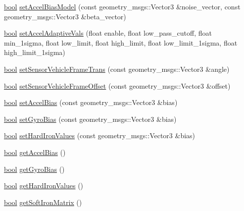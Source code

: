 \begin{DoxyCompactItemize}
\item 
\hyperlink{classbool}{bool} \hyperlink{classmicrostrain__mips__client_1_1ClMicrostainMips_a09d57c6812308c11a7e99f9d75635f51}{set\+Accel\+Bias\+Model} (const geometry\+\_\+msgs\+::\+Vector3 \&noise\+\_\+vector, const geometry\+\_\+msgs\+::\+Vector3 \&beta\+\_\+vector)
\item 
\hyperlink{classbool}{bool} \hyperlink{classmicrostrain__mips__client_1_1ClMicrostainMips_a93a968d06f2dfd58ce7ab568956df042}{set\+Accel\+Adaptive\+Vals} (float enable, float low\+\_\+pass\+\_\+cutoff, float min\+\_\+1sigma, float low\+\_\+limit, float high\+\_\+limit, float low\+\_\+limit\+\_\+1sigma, float high\+\_\+limit\+\_\+1sigma)
\item 
\hyperlink{classbool}{bool} \hyperlink{classmicrostrain__mips__client_1_1ClMicrostainMips_ac3d76fa8986d20e6b33ba4b556f09577}{set\+Sensor\+Vehicle\+Frame\+Trans} (const geometry\+\_\+msgs\+::\+Vector3 \&angle)
\item 
\hyperlink{classbool}{bool} \hyperlink{classmicrostrain__mips__client_1_1ClMicrostainMips_a8eb34d4f970c6e8a2a6ec3e80dd793bf}{set\+Sensor\+Vehicle\+Frame\+Offset} (const geometry\+\_\+msgs\+::\+Vector3 \&offset)
\item 
\hyperlink{classbool}{bool} \hyperlink{classmicrostrain__mips__client_1_1ClMicrostainMips_a8864e13bc5b385794642e49764cbfe8c}{set\+Accel\+Bias} (const geometry\+\_\+msgs\+::\+Vector3 \&bias)
\item 
\hyperlink{classbool}{bool} \hyperlink{classmicrostrain__mips__client_1_1ClMicrostainMips_a8158790c0154c7e7412594276f448c33}{set\+Gyro\+Bias} (const geometry\+\_\+msgs\+::\+Vector3 \&bias)
\item 
\hyperlink{classbool}{bool} \hyperlink{classmicrostrain__mips__client_1_1ClMicrostainMips_afdc49a602ec8906792b3e8ea8a173ceb}{set\+Hard\+Iron\+Values} (const geometry\+\_\+msgs\+::\+Vector3 \&bias)
\item 
\hyperlink{classbool}{bool} \hyperlink{classmicrostrain__mips__client_1_1ClMicrostainMips_a21083a65193b40c4121814e9d17a7a29}{get\+Accel\+Bias} ()
\item 
\hyperlink{classbool}{bool} \hyperlink{classmicrostrain__mips__client_1_1ClMicrostainMips_adc09d9048e3289f309bd10f3422dd03d}{get\+Gyro\+Bias} ()
\item 
\hyperlink{classbool}{bool} \hyperlink{classmicrostrain__mips__client_1_1ClMicrostainMips_aad7874f7708db6915fb739c99f7e0701}{get\+Hard\+Iron\+Values} ()
\item 
\hyperlink{classbool}{bool} \hyperlink{classmicrostrain__mips__client_1_1ClMicrostainMips_a1bfdd1f0a1294d6e86f5ad79e74e03c9}{get\+Soft\+Iron\+Matrix} ()

\end{DoxyCompactItemize}
